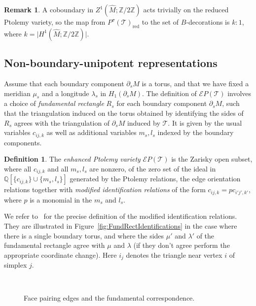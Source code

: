 \documentclass[11pt]{amsart}
\theoremstyle{plain}
\theoremstyle{definition}
\newtheorem{definition}[theorem]{Definition}
\newtheorem{remark}[theorem]{Remark}
\numberwithin{equation}{section}
\newcommand{\Z}{\mathbb Z}
\newcommand{\Q}{\mathbb Q}
\newcommand{\T}{\mathcal T}
\newcommand{\E}{\mathcal E}
\DeclareMathOperator{\red}{red}
\begin{document}
\begin{remark}
A coboundary in $Z^1(\widehat M;\Z/2\Z)$ acts trivially on the reduced Ptolemy variety, so the map from $P^\sigma(\T)_{\red}$ to the set of $B$-decorations is $k:1$, where $k=\big\vert H^1(\widehat M;\Z/2\Z)\big\vert$.
\end{remark}

\subsection{Non-boundary-unipotent representations}\label{sec:Enhanced}
Assume that each boundary component $\partial_s M$ is a torus, and that we have fixed a meridian $\mu_s$ and a longitude $\lambda_s$ in $H_1(\partial_s M)$. The definition of $\E P(\T)$ involves a choice of \emph{fundamental rectangle} $R_s$ for each boundary component $\partial_s M$, such that the triangulation induced on the torus obtained by identifying the sides of $R_s$ agrees with the triangulation of $\partial_s M$ induced by $\T$. It is given by the usual variables $c_{ij,k}$ as well as additional variables $m_s,l_s$ indexed by the boundary components. 
\begin{definition}\label{def:EnhancedPtolemy}
The \emph{enhanced Ptolemy variety} $\E P(\T)$ is the Zarisky open subset, where all $c_{ij,k}$ and all $m_s,l_s$ are nonzero, of the zero set of the ideal in $\Q[{\{c_{ij,k}\}}\cup\{m_s,l_s\}]$ generated by the Ptolemy relations, the edge orientation relations together with \emph{modified identification relations} of the form $c_{ij,k}=pc_{i'j',k'}$, where $p$ is a monomial in the $m_s$ and $l_s$.
\end{definition}
We refer to~\cite{ZickertEnhancedPtolemy} for the precise definition of the modified identification relations. They are illustrated in Figure~\ref{fig:FundRectIdentifications} in the case where there is a single boundary torus, and where the sides $\mu'$ and $\lambda'$ of the fundamental rectangle agree with $\mu$ and $\lambda$ (if they don't agree perform the appropriate coordinate change). Here $i_j$ denotes the triangle near vertex $i$ of simplex $j$.

\begin{figure}[htb]
\hspace{-1cm}
\begin{minipage}[b]{0.55\textwidth}
\scalebox{0.75}{}
\end{minipage}
\hspace{1cm}
\begin{minipage}[b]{0.25\textwidth}
\scalebox{0.92}{}
\end{minipage}\\
\begin{minipage}[t]{0.55\textwidth}
\caption{The identification relations for a face pairing $\alpha$.}\label{fig:FundRectIdentifications}
\end{minipage}
\begin{minipage}[t]{0.42\textwidth}
\caption{Face pairing edges and the fundamental correspondence.}\label{fig:EPCocycle}
\end{minipage}
\end{figure}
\end{document}
